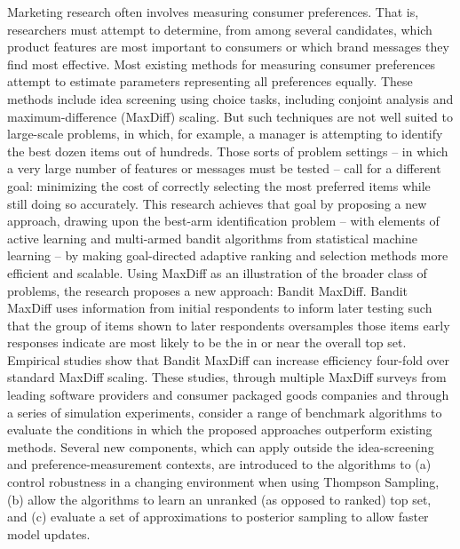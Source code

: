 \documentclass[blindrev,mnsc]{informs3}
\begin{document}
\ABSTRACT
{%

Marketing research often involves measuring consumer preferences.  That is, researchers must attempt to determine, from among several candidates, which product features are most important to consumers or which brand messages they find most effective.  Most existing methods for measuring consumer preferences attempt to estimate parameters representing all preferences equally.  These methods include idea screening using choice tasks, including conjoint analysis and maximum-difference (MaxDiff) scaling.  But such techniques are not well suited to large-scale problems, in which, for example, a manager is attempting to identify the best dozen items out of hundreds. Those sorts of problem settings -- in which a very large number of features or messages must be tested -- call for a different goal: minimizing the cost of correctly selecting the most preferred items while still doing so accurately. This research achieves that goal by proposing a new approach, drawing upon the best-arm identification problem -- with elements of active learning and multi-armed bandit algorithms from statistical machine learning -- by making goal-directed adaptive ranking and selection methods more efficient and scalable. Using MaxDiff as an illustration of the broader class of problems, the research proposes a new approach: Bandit MaxDiff.  Bandit MaxDiff uses information from initial respondents to inform later testing such that the group of items shown to later respondents oversamples those items early responses indicate are most likely to be the in or near the overall top set. Empirical studies show that Bandit MaxDiff can increase efficiency four-fold over standard MaxDiff scaling. These studies, through multiple MaxDiff surveys from leading software providers and consumer packaged goods companies and through a series of simulation experiments, consider a range of benchmark algorithms to evaluate the conditions in which the proposed approaches outperform existing methods. Several new components, which can apply outside the idea-screening and preference-measurement contexts, are introduced to the algorithms to (a) control robustness in a changing environment when using Thompson Sampling, (b) allow the algorithms to learn an unranked (as opposed to ranked) top set, and (c) evaluate a set of approximations to posterior sampling to allow faster model updates.

} 


\end{document}
